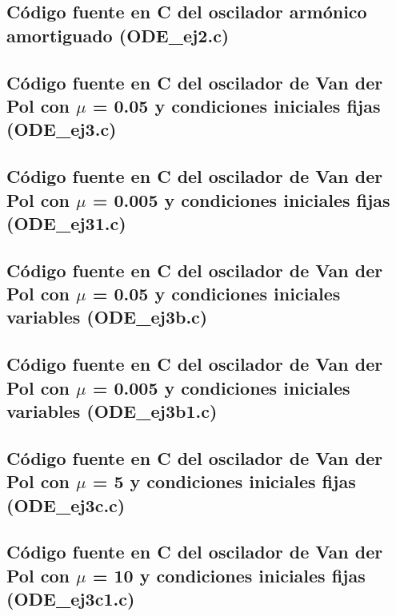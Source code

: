\documentclass[a4paper,12pt]{article}
\begin{document}
\subsection{C\'odigo fuente en C del oscilador arm\'onico amortiguado (ODE\_ej2.c)}




\subsection{C\'odigo fuente en C del oscilador de Van der Pol con $\mu$ = 0.05 y condiciones iniciales fijas (ODE\_ej3.c)}




\subsection{C\'odigo fuente en C del oscilador de Van der Pol con $\mu$ = 0.005 y condiciones iniciales fijas (ODE\_ej31.c)}




\subsection{C\'odigo fuente en C del oscilador de Van der Pol con $\mu$ = 0.05 y condiciones iniciales variables (ODE\_ej3b.c)}




\subsection{C\'odigo fuente en C del oscilador de Van der Pol con $\mu$ = 0.005 y condiciones iniciales variables (ODE\_ej3b1.c)}




\subsection{C\'odigo fuente en C del oscilador de Van der Pol con $\mu$ = 5 y condiciones iniciales fijas (ODE\_ej3c.c)}



\subsection{C\'odigo fuente en C del oscilador de Van der Pol con $\mu$ = 10 y condiciones iniciales fijas (ODE\_ej3c1.c)}
\end{document}
